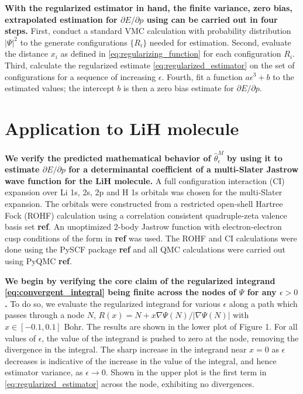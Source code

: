 \documentclass{article}
\begin{document}
\textbf{With the regularized estimator in hand, the finite variance, zero bias, extrapolated estimation for $\partial E/\partial p$ using can be carried out in four steps.}
First, conduct a standard VMC calculation with probability distribution $|\Psi|^2$ to the generate configurations $\{R_i\}$ needed for estimation.
Second, evaluate the distance $x_i$ as defined in \eqref{eq:regularizing_function} for each configuration $R_i$.
Third, calculate the regularized estimate \eqref{eq:regularized_estimator} on the set of configurations for a sequence of increasing $\epsilon$.
Fourth, fit a function $a\epsilon^3 + b$ to the estimated values; the intercept $b$ is then a zero bias estimate for $\partial E/\partial p.$

\section{Application to LiH molecule}
\textbf{We verify the predicted mathematical behavior of $\hat{\theta}_\epsilon^M$ by using it to estimate $\partial E/\partial p$ for a determinantal coefficient of a multi-Slater Jastrow wave function for the LiH molecule.}
A full configuration interaction (CI) expansion over Li 1s, 2s, 2p and H 1s orbitals was chosen for the multi-Slater expansion.
The orbitals were constructed from a restricted open-shell Hartree Fock (ROHF) calculation using a correlation consistent quadruple-zeta valence basis set \textbf{ref}.
An unoptimized 2-body Jastrow function with electron-electron cusp conditions of the form in \textbf{ref} was used.
The ROHF and CI calculations were done using the PySCF package \textbf{ref} and all QMC calculations were carried out using PyQMC \textbf{ref}.

\textbf{We begin by verifying the core claim of the regularized integrand \eqref{eq:convergent_integral} being finite across the nodes of $\Psi$ for any $\epsilon > 0$.}
To do so, we evaluate the regularized integrand for various $\epsilon$ along a path which passes through a node $N$, $R(x) = N + x \nabla \Psi(N)/|\nabla \Psi(N)|$ with $x \in [-0.1, 0.1]$ Bohr.
The results are shown in the lower plot of Figure 1.
For all values of $\epsilon$, the value of the integrand is pushed to zero at the node, removing the divergence in the integral.
The sharp increase in the integrand near $x=0$ as $\epsilon$ decreases is indicative of the increase in the value of the integral, and hence estimator variance, as $\epsilon \rightarrow 0$.
Shown in the upper plot is the first term in \eqref{eq:regularized_estimator} across the node, exhibiting no divergences.
\end{document}
